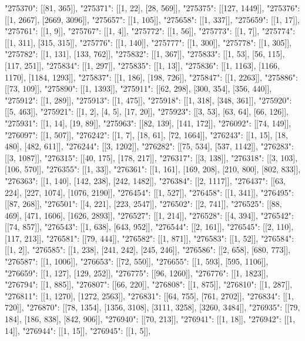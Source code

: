 { "275370": [[81, 365]],
 "275371": [[1, 22], [28, 569]],
 "275375": [[127, 1449]],
 "275376": [[1, 2667], [2669, 3096]],
 "275657": [[1, 105]],
 "275658": [[1, 337]],
 "275659": [[1, 17]],
 "275761": [[1, 9]],
 "275767": [[1, 4]],
 "275772": [[1, 56]],
 "275773": [[1, 7]],
 "275774": [[1, 311], [315, 315]],
 "275776": [[1, 140]],
 "275777": [[1, 300]],
 "275778": [[1, 305]],
 "275782": [[1, 131], [133, 762]],
 "275832": [[1, 367]],
 "275833": [[1, 53], [56, 115], [117, 251]],
 "275834": [[1, 297]],
 "275835": [[1, 13]],
 "275836": [[1, 1163], [1166, 1170], [1184, 1293]],
 "275837": [[1, 186], [198, 726]],
 "275847": [[1, 2263]],
 "275886": [[73, 109]],
 "275890": [[1, 1393]],
 "275911": [[62, 298], [300, 354], [356, 440]],
 "275912": [[1, 289]],
 "275913": [[1, 475]],
 "275918": [[1, 318], [348, 361]],
 "275920": [[5, 463]],
 "275921": [[1, 2], [4, 5], [17, 20]],
 "275923": [[3, 53], [63, 64], [66, 126]],
 "275931": [[1, 14], [19, 89]],
 "275963": [[82, 139], [141, 172]],
 "276092": [[74, 149]],
 "276097": [[1, 507]],
 "276242": [[1, 7], [18, 61], [72, 1664]],
 "276243": [[1, 15], [18, 480], [482, 611]],
 "276244": [[3, 1202]],
 "276282": [[75, 534], [537, 1142]],
 "276283": [[3, 1087]],
 "276315": [[40, 175], [178, 217]],
 "276317": [[3, 138]],
 "276318": [[3, 103], [106, 570]],
 "276355": [[1, 33]],
 "276361": [[1, 161], [169, 208], [210, 800], [802, 833]],
 "276363": [[1, 140], [142, 238], [242, 1482]],
 "276384": [[2, 1117]],
 "276437": [[63, 224], [227, 1074], [1076, 2190]],
 "276454": [[1, 527]],
 "276458": [[1, 341]],
 "276495": [[87, 268]],
 "276501": [[4, 221], [223, 2547]],
 "276502": [[2, 741]],
 "276525": [[88, 469], [471, 1606], [1626, 2893]],
 "276527": [[1, 214]],
 "276528": [[4, 394]],
 "276542": [[74, 857]],
 "276543": [[1, 638], [643, 952]],
 "276544": [[2, 161]],
 "276545": [[2, 110], [117, 213]],
 "276581": [[79, 444]],
 "276582": [[1, 871]],
 "276583": [[1, 52]],
 "276584": [[1, 2]],
 "276585": [[1, 238], [241, 242], [245, 246]],
 "276586": [[2, 658], [680, 773]],
 "276587": [[1, 1006]],
 "276653": [[72, 550]],
 "276655": [[1, 593], [595, 1106]],
 "276659": [[1, 127], [129, 252]],
 "276775": [[96, 1260]],
 "276776": [[1, 1823]],
 "276794": [[1, 885]],
 "276807": [[66, 220]],
 "276808": [[1, 875]],
 "276810": [[1, 287]],
 "276811": [[1, 1270], [1272, 2563]],
 "276831": [[64, 755], [761, 2702]],
 "276834": [[1, 720]],
 "276870": [[78, 1354], [1356, 3108], [3111, 3258], [3260, 3484]],
 "276935": [[79, 184], [186, 838], [842, 906]],
 "276940": [[70, 213]],
 "276941": [[1, 18]],
 "276942": [[1, 14]],
 "276944": [[1, 15]],
 "276945": [[1, 5]],
}
